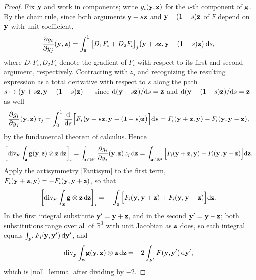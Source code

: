 \begin{proof}
	Fix $\mathbf{y}$ and work in components; write $g_i(\mathbf{y},\mathbf{z})$ for the $i$-th component of $\mathbf{g}$. By the chain rule, since both arguments $\mathbf{y}+s\mathbf{z}$ and $\mathbf{y}-(1-s)\mathbf{z}$ of $F$ depend on $\mathbf{y}$ with unit coefficient,
	\begin{equation}
		\frac{\partial g_i}{\partial y_j}(\mathbf{y},\mathbf{z}) = \int_0^1 \big[D_1F_i + D_2F_i\big]_j\big(\mathbf{y}+s\mathbf{z},\mathbf{y}-(1-s)\mathbf{z}\big)\,\mathrm{d} s,
	\end{equation}
	where $D_1F_i,D_2F_i$ denote the gradient of $F_i$ with respect to its first and second argument, respectively. Contracting with $z_j$ and recognizing the resulting expression as a total derivative with respect to $s$ along the path $s\mapsto(\mathbf{y}+s\mathbf{z},\mathbf{y}-(1-s)\mathbf{z})$ --- since $\mathrm{d}(\mathbf{y}+s\mathbf{z})/\mathrm{d} s=\mathbf{z}$ and $\mathrm{d}(\mathbf{y}-(1-s)\mathbf{z})/\mathrm{d} s=\mathbf{z}$ as well ---
	\begin{equation}
		\frac{\partial g_i}{\partial y_j}(\mathbf{y},\mathbf{z})\,z_j = \int_0^1 \frac{\mathrm{d}}{\mathrm{d} s}\Big[F_i\big(\mathbf{y}+s\mathbf{z},\mathbf{y}-(1-s)\mathbf{z}\big)\Big]\mathrm{d} s = F_i(\mathbf{y}+\mathbf{z},\mathbf{y}) - F_i(\mathbf{y},\mathbf{y}-\mathbf{z}),
	\end{equation}
	by the fundamental theorem of calculus. Hence
	\begin{equation}
		\left[\operatorname{div}_{\mathbf{y}}\int_{\mathbf{z}}\mathbf{g}(\mathbf{y},\mathbf{z})\otimes\mathbf{z}\,\mathrm{d}\mathbf{z}\right]_i = \int_{\mathbf{z}\in\mathbb R^3}\frac{\partial g_i}{\partial y_j}(\mathbf{y},\mathbf{z})\,z_j\,\mathrm{d}\mathbf{z} = \int_{\mathbf{z}\in\mathbb R^3}\Big[F_i(\mathbf{y}+\mathbf{z},\mathbf{y})-F_i(\mathbf{y},\mathbf{y}-\mathbf{z})\Big]\mathrm{d}\mathbf{z}.
	\end{equation}
	Apply the antisymmetry \eqref{Fantisym} to the first term, $F_i(\mathbf{y}+\mathbf{z},\mathbf{y})=-F_i(\mathbf{y},\mathbf{y}+\mathbf{z})$, so that
	\begin{equation}
		\left[\operatorname{div}_{\mathbf{y}}\int_{\mathbf{z}}\mathbf{g}\otimes\mathbf{z}\,\mathrm{d}\mathbf{z}\right]_i = -\int_{\mathbf{z}}\Big[F_i(\mathbf{y},\mathbf{y}+\mathbf{z}) + F_i(\mathbf{y},\mathbf{y}-\mathbf{z})\Big]\mathrm{d}\mathbf{z}.
	\end{equation}
	In the first integral substitute $\mathbf{y}'=\mathbf{y}+\mathbf{z}$, and in the second $\mathbf{y}'=\mathbf{y}-\mathbf{z}$; both substitutions range over all of $\mathbb R^3$ with unit Jacobian as $\mathbf{z}$ does, so each integral equals $\int_{\mathbf{y}'}F_i(\mathbf{y},\mathbf{y}')\,\mathrm{d}\mathbf{y}'$, and
	\begin{equation}
		\operatorname{div}_{\mathbf{y}}\int_{\mathbf{z}}\mathbf{g}(\mathbf{y},\mathbf{z})\otimes\mathbf{z}\,\mathrm{d}\mathbf{z} = -2\int_{\mathbf{y}'}F(\mathbf{y},\mathbf{y}')\,\mathrm{d}\mathbf{y}',
	\end{equation}
	which is \eqref{noll_lemma} after dividing by $-2$.
\end{proof}

